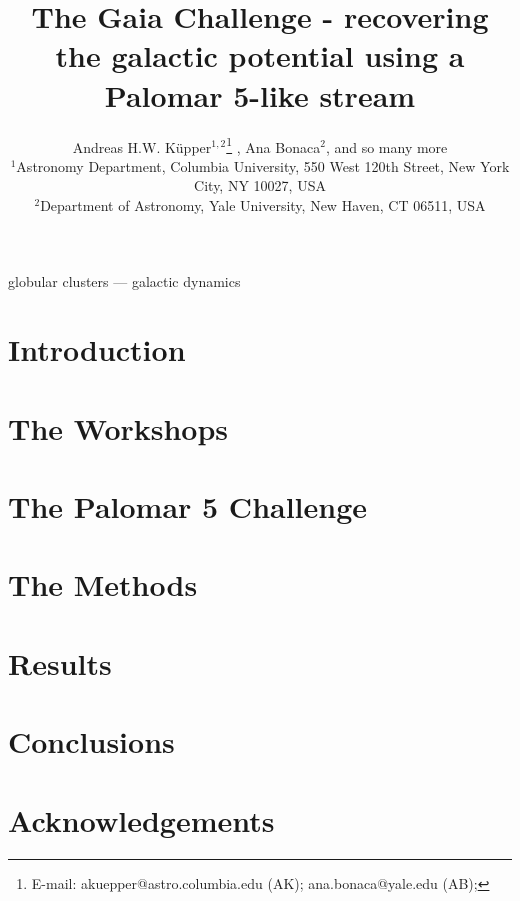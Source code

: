 \documentclass[useAMS,usenatbib, a4paper]{mn2e}
\title[Gaia Challenge - Palomar 5]{The Gaia Challenge - recovering the galactic potential using a Palomar
5-like stream}
\author[K\"upper et al.]
{Andreas H.W. K\"{u}pper$^{1,2}$\thanks{
E-mail: \mbox{akuepper@astro.columbia.edu} (AK);
 \mbox{ana.bonaca@yale.edu} (AB);}
, Ana Bonaca$^{2}$, and so many more\\
$^{1}$Astronomy Department, Columbia University, 550 West 120th Street, New York City, NY 10027, USA\\
$^{2}$Department of Astronomy, Yale University, New Haven, CT 06511, USA\\
}
\begin{document}


\maketitle

\label{firstpage}

\begin{abstract}

\end{abstract}




\begin{keywords}
globular clusters --- galactic dynamics
\end{keywords}





\section{Introduction}



\section{The Workshops}



\section{The Palomar 5 Challenge}



\section{The Methods}



\section{Results}



\section{Conclusions}



\section*{Acknowledgements}


\begin{thebibliography}{99}

\end{thebibliography}



\bsp \label{lastpage} 
\end{document}
